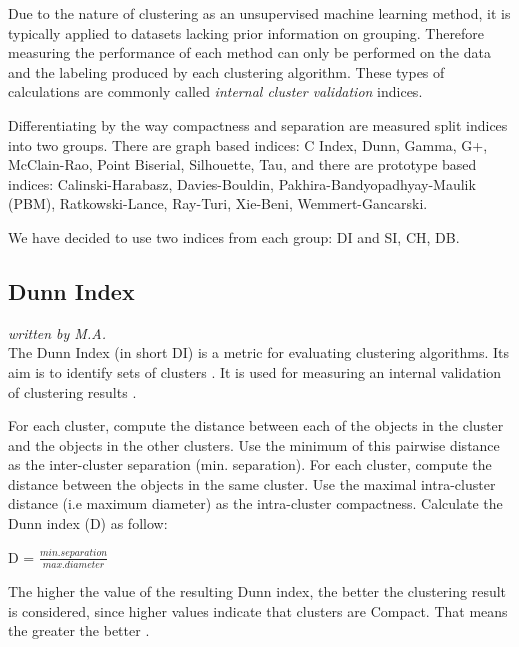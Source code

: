 Due to the nature of clustering as an unsupervised machine learning method, it is typically applied to datasets lacking prior information on grouping. Therefore measuring the performance of each method can only be performed on the data and the labeling produced by each clustering algorithm. These types of calculations are commonly called \textit{internal cluster validation} indices.

Differentiating by the way compactness and separation are measured \cite{balbi2016cosine} split indices into two groups. There are graph based indices: C Index, Dunn, Gamma, G+, McClain-Rao, Point Biserial, Silhouette, Tau, and there are prototype based indices: Calinski-Harabasz, Davies-Bouldin, Pakhira-Bandyopadhyay-Maulik (PBM), Ratkowski-Lance, Ray-Turi, Xie-Beni, Wemmert-Gancarski. 

We have decided to use two indices from each group: \gls{DI} and \gls{SI}, \gls{CH}, \gls{DB}. 


\subsection{Dunn Index}
\textit{written by M.A.}\\


The Dunn Index (in short DI) is a metric for evaluating clustering algorithms. Its aim is to identify sets of clusters \cite{dunn2016rizzo}. It is used for measuring an internal validation of clustering results \cite{BENNCIR2021102751}. \newline

For each cluster, compute the distance between each of the objects in the cluster and the objects in the other clusters. Use the minimum of this pairwise distance as the inter-cluster separation (min. separation). For each cluster, compute the distance between the objects in the same cluster. Use the maximal intra-cluster distance (i.e maximum diameter) as the intra-cluster compactness. Calculate the Dunn index (D) as follow: \newline

D = $\frac{min.separation}{max.diameter}$ \cite{BENNCIR2021102751} \newline

The higher the value of the resulting Dunn index, the better the clustering
result is considered, since higher values indicate that clusters are Compact.
That means the greater the better \cite{dunnblog2019rizzo}. \newline

